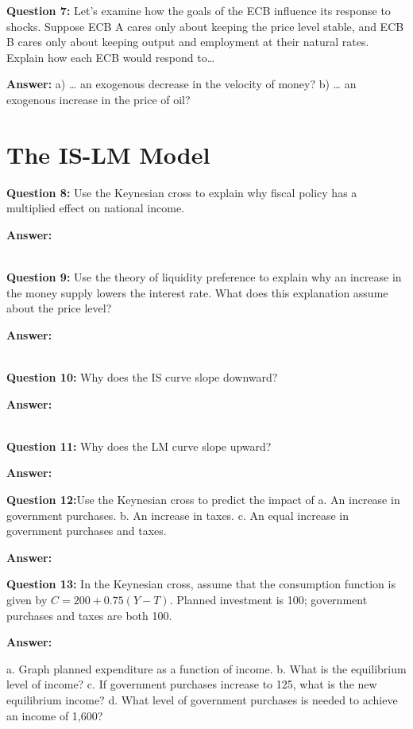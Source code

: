 \documentclass[a4paper, 11pt]{article}
\begin{document}
\textbf{Question 7:} Let’s examine how the goals of the ECB influence its response to shocks. Suppose ECB A cares only about keeping the price level stable, and ECB B cares only about keeping output and employment at their natural rates. Explain how each ECB would respond to…

\textbf{Answer:} 
a) … an exogenous decrease in the velocity of money?
b) … an exogenous increase in the price of oil? \\

\section{The IS-LM Model}

\textbf{Question 8:} Use the Keynesian cross to explain why fiscal policy has a multiplied effect on national income.

\textbf{Answer:} 

\\

\textbf{Question 9:} Use the theory of liquidity preference to explain why an increase in the money supply lowers the interest rate. What does this explanation assume about the price level?

\textbf{Answer:} 

\\

\textbf{Question 10:} Why does the IS curve slope downward?

\textbf{Answer:} 

  \\

\textbf{Question 11:} Why does the LM curve slope upward?

\textbf{Answer:} 



\textbf{Question 12:}Use the Keynesian cross to predict the impact of
a. An increase in government purchases.
b. An increase in taxes.
c. An equal increase in government purchases and taxes.

\textbf{Answer:} 


\textbf{Question 13:} In the Keynesian cross, assume that the consumption function is given by $C = 200 + 0.75 (Y − T)$. Planned investment is 100; government purchases and taxes are both 100.

\textbf{Answer:}

a. Graph planned expenditure as a function of income.
b. What is the equilibrium level of income?
c. If government purchases increase to 125, what is the new equilibrium income?
d. What level of government purchases is needed to achieve an income of 1,600?
\end{document}
